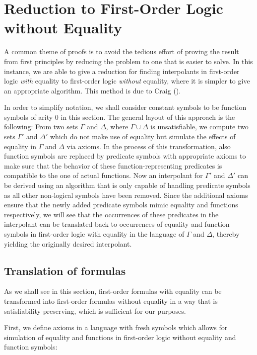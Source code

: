 \chapter{Reduction to First-Order Logic without Equality}
\label{chap:reduction}

A common theme of proofs is to avoid the tedious effort of proving the result from first principles by reducing the problem to one that is easier to solve.
In this instance, we are able to give a reduction for finding interpolants in first-order logic \emph{with} equality to first-order logic \emph{without} equality, where it is simpler to give an appropriate algorithm.
This method is due to Craig (\cite{Craig57linear,Craig57three}).

In order to simplify notation, we shall consider constant symbols to be function symbols of arity $0$ in this section.
The general layout of this approach is the following:
From two sets $\Gamma$ and $\Delta$, where $\Gamma \cup \Delta$ is unsatisfiable, we compute two sets $\Gamma'$ and $\Delta'$ which do not make use of equality but simulate the effects of equality in $\Gamma$ and $\Delta$ via axioms.
In the process of this transformation, also function symbols are replaced by predicate symbols with appropriate axioms to make sure that the behavior of these function-representing predicates is compatible to the one of actual functions.
Now an interpolant for $\Gamma'$ and $\Delta'$ can be derived using an algorithm that is only capable of handling predicate symbols as all other non-logical symbols have been removed.
Since the additional axioms ensure that the newly added predicate symbols mimic equality and functions respectively, we will see that the occurrences of these predicates in the interpolant can be translated back to occurrences of equality and function symbols in first-order logic with equality in the language of $\Gamma$ and $\Delta$, thereby yielding the originally desired interpolant.


\section{Translation of formulas}

As we shall see in this section, first-order formulas with equality can be transformed into first-order formulas without equality in a way that is satisfiability-preserving, which is sufficient for our purposes.

First, we define axioms in a language with fresh symbols which allows for simulation of equality and functions in first-order logic without equality and function symbols:

